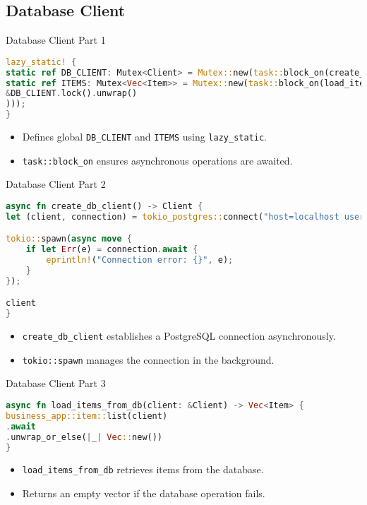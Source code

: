 \documentclass[aspectratio=169, table]{beamer}
\begin{document}
\subsection{Database Client}
\begin{frame}[fragile]{Database Client Part 1}
\begin{lstlisting}[language=Rust]
lazy_static! {
static ref DB_CLIENT: Mutex<Client> = Mutex::new(task::block_on(create_db_client()));
static ref ITEMS: Mutex<Vec<Item>> = Mutex::new(task::block_on(load_items_from_db(
&DB_CLIENT.lock().unwrap()
)));
}
\end{lstlisting}

\begin{itemize}
\item Defines global \texttt{DB\_CLIENT} and \texttt{ITEMS} using \texttt{lazy\_static}.
\item \texttt{task::block\_on} ensures asynchronous operations are awaited.
\end{itemize}
\end{frame}

\begin{frame}[fragile]{Database Client Part 2}
\vspace{15pt}
\begin{lstlisting}[language=Rust]
async fn create_db_client() -> Client {
let (client, connection) = tokio_postgres::connect("host=localhost user=postgres password=1234 dbname=session10", NoTls, ).await.unwrap();

tokio::spawn(async move {
	if let Err(e) = connection.await {
		eprintln!("Connection error: {}", e);
	}
});

client
}
\end{lstlisting}

\begin{itemize}
\item \texttt{create\_db\_client} establishes a PostgreSQL connection asynchronously.
\item \texttt{tokio::spawn} manages the connection in the background.
\end{itemize}
\end{frame}

\begin{frame}[fragile]{Database Client Part 3}
\begin{lstlisting}[language=Rust]
async fn load_items_from_db(client: &Client) -> Vec<Item> {
business_app::item::list(client)
.await
.unwrap_or_else(|_| Vec::new())
}
\end{lstlisting}

\begin{itemize}
\item \texttt{load\_items\_from\_db} retrieves items from the database.
\item Returns an empty vector if the database operation fails.
\end{itemize}
\end{frame}
\end{document}
